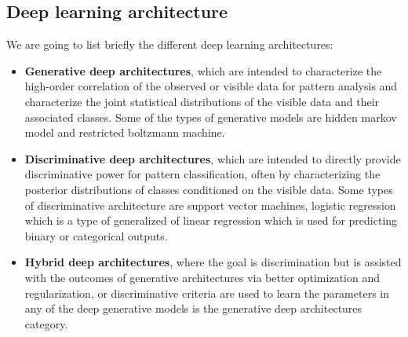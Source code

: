 \subsection{Deep learning architecture}
We are going to list briefly the different deep learning architectures:
\begin{itemize}
\item \textbf{Generative deep architectures}, which are intended to characterize the high-order correlation of the observed or visible data for pattern analysis and characterize the joint statistical distributions of the visible data and their associated classes. \cite{dechter_learning_1986} Some of the types of generative models are hidden markov model and restricted boltzmann machine.
\item \textbf{Discriminative deep architectures}, which are intended to directly provide discriminative power for pattern classification, often by characterizing the posterior distributions of classes conditioned on the visible data. Some types of discriminative architecture are support vector machines, logistic regression which is a type of generalized of linear regression which is used for predicting binary or categorical outputs. 
\item \textbf{Hybrid deep architectures}, where the goal is discrimination but is assisted with the outcomes of generative architectures via better optimization and regularization, or discriminative criteria are used to learn the parameters in any of the deep generative models is the generative deep architectures category. \cite{deng_three_2012}
\end{itemize}
